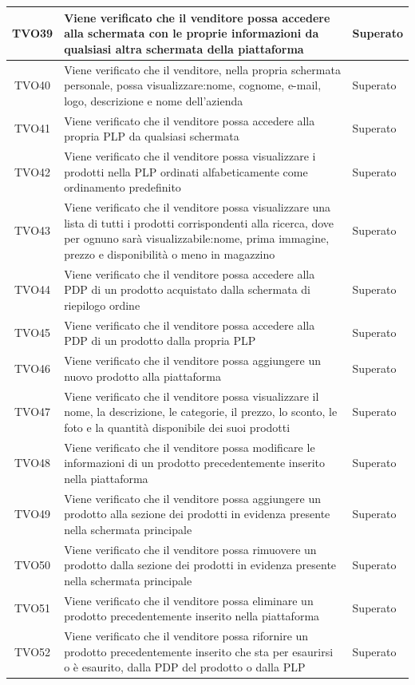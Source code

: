 \begin{longtable}{|c| C{10cm} |C{3cm}|}
	TVO39 & Viene verificato che il venditore possa accedere alla schermata con le proprie informazioni da qualsiasi altra schermata della piattaforma & Superato\\ \hline
	TVO40 & Viene verificato che il venditore, nella propria schermata personale, possa visualizzare:nome, cognome, e-mail, logo, descrizione e nome dell'azienda & Superato\\ \hline
	TVO41 & Viene verificato che il venditore possa accedere alla propria PLP da qualsiasi schermata & Superato\\ \hline
	TVO42 & Viene verificato che il venditore possa visualizzare i prodotti nella PLP ordinati alfabeticamente come ordinamento predefinito & Superato\\ \hline
	TVO43 & Viene verificato che il venditore possa visualizzare una lista di tutti i prodotti corrispondenti alla ricerca, dove per ognuno sarà visualizzabile:nome, prima immagine, prezzo e disponibilità o meno in magazzino & Superato\\ \hline
	TVO44 & Viene verificato che il venditore possa accedere alla PDP di un prodotto acquistato dalla schermata di riepilogo ordine & Superato\\ \hline
	TVO45 & Viene verificato che il venditore possa accedere alla PDP di un prodotto dalla propria PLP & Superato\\ \hline
	TVO46 & Viene verificato che il venditore possa aggiungere un nuovo prodotto alla piattaforma & Superato\\ \hline
	TVO47 & Viene verificato che il venditore possa visualizzare il nome, la descrizione, le categorie, il prezzo, lo sconto, le foto e la quantità disponibile dei suoi prodotti & Superato\\ \hline
	TVO48 & Viene verificato che il venditore possa modificare le informazioni di un prodotto precedentemente inserito nella piattaforma & Superato\\ \hline
	TVO49 & Viene verificato che il venditore possa aggiungere un prodotto alla sezione dei prodotti in evidenza presente nella schermata principale & Superato\\ \hline
	TVO50 & Viene verificato che il venditore possa rimuovere un prodotto dalla sezione dei prodotti in evidenza  presente nella schermata principale & Superato\\ \hline
	TVO51 & Viene verificato che il venditore possa eliminare un prodotto precedentemente inserito nella piattaforma & Superato\\ \hline
	TVO52 & Viene verificato che il venditore possa rifornire un prodotto precedentemente inserito che sta per esaurirsi o è esaurito, dalla PDP del prodotto o dalla PLP & Superato\\ \hline

\end{longtable}
